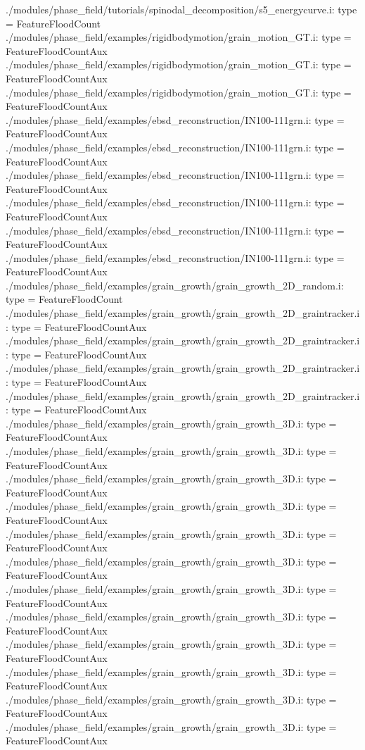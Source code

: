 ./modules/phase_field/tutorials/spinodal_decomposition/s5_energycurve.i:    type = FeatureFloodCount
./modules/phase_field/examples/rigidbodymotion/grain_motion_GT.i:    type = FeatureFloodCountAux
./modules/phase_field/examples/rigidbodymotion/grain_motion_GT.i:    type = FeatureFloodCountAux
./modules/phase_field/examples/rigidbodymotion/grain_motion_GT.i:    type = FeatureFloodCountAux
./modules/phase_field/examples/ebsd_reconstruction/IN100-111grn.i:    type = FeatureFloodCountAux
./modules/phase_field/examples/ebsd_reconstruction/IN100-111grn.i:    type = FeatureFloodCountAux
./modules/phase_field/examples/ebsd_reconstruction/IN100-111grn.i:    type = FeatureFloodCountAux
./modules/phase_field/examples/ebsd_reconstruction/IN100-111grn.i:    type = FeatureFloodCountAux
./modules/phase_field/examples/ebsd_reconstruction/IN100-111grn.i:    type = FeatureFloodCountAux
./modules/phase_field/examples/ebsd_reconstruction/IN100-111grn.i:    type = FeatureFloodCountAux
./modules/phase_field/examples/grain_growth/grain_growth_2D_random.i:    type = FeatureFloodCount
./modules/phase_field/examples/grain_growth/grain_growth_2D_graintracker.i:    type = FeatureFloodCountAux
./modules/phase_field/examples/grain_growth/grain_growth_2D_graintracker.i:    type = FeatureFloodCountAux
./modules/phase_field/examples/grain_growth/grain_growth_2D_graintracker.i:    type = FeatureFloodCountAux
./modules/phase_field/examples/grain_growth/grain_growth_2D_graintracker.i:    type = FeatureFloodCountAux
./modules/phase_field/examples/grain_growth/grain_growth_3D.i:    type = FeatureFloodCountAux
./modules/phase_field/examples/grain_growth/grain_growth_3D.i:    type = FeatureFloodCountAux
./modules/phase_field/examples/grain_growth/grain_growth_3D.i:    type = FeatureFloodCountAux
./modules/phase_field/examples/grain_growth/grain_growth_3D.i:    type = FeatureFloodCountAux
./modules/phase_field/examples/grain_growth/grain_growth_3D.i:    type = FeatureFloodCountAux
./modules/phase_field/examples/grain_growth/grain_growth_3D.i:    type = FeatureFloodCountAux
./modules/phase_field/examples/grain_growth/grain_growth_3D.i:    type = FeatureFloodCountAux
./modules/phase_field/examples/grain_growth/grain_growth_3D.i:    type = FeatureFloodCountAux
./modules/phase_field/examples/grain_growth/grain_growth_3D.i:    type = FeatureFloodCountAux
./modules/phase_field/examples/grain_growth/grain_growth_3D.i:    type = FeatureFloodCountAux
./modules/phase_field/examples/grain_growth/grain_growth_3D.i:    type = FeatureFloodCountAux
./modules/phase_field/examples/grain_growth/grain_growth_3D.i:    type = FeatureFloodCountAux
